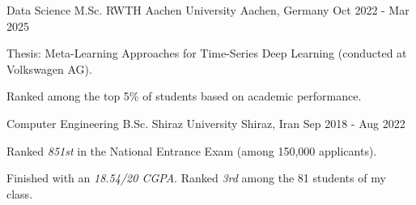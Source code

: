 

\begin{cventries}

  \cventry
    {Data Science M.Sc.} %
    {RWTH Aachen University} %
    {Aachen, Germany} %
    {Oct 2022 - Mar 2025} %
    {
      \begin{cvitems} %
        \item {Thesis: Meta-Learning Approaches for Time-Series Deep Learning (conducted at Volkswagen AG).}
        \item {Ranked among the top 5\% of students based on academic performance.}
      \end{cvitems}
    }
    
  \cventry
    {Computer Engineering B.Sc.} %
    {Shiraz University} %
    {Shiraz, Iran} %
    {Sep 2018 - Aug 2022} %
    {
      \begin{cvitems} %
        \item {Ranked \emph{851st} in the National Entrance Exam (among 150,000 applicants).}
        \item {Finished with an \emph{18.54/20 CGPA}. Ranked \emph{3rd} among the 81 students of my class.}
      \end{cvitems}
    }
\end{cventries}

